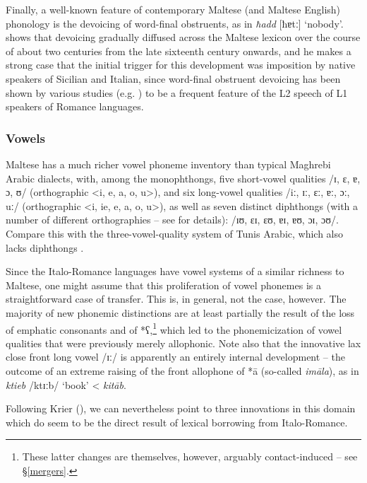 \documentclass[output=paper]{langsci/langscibook}
\begin{document}
Finally, a well-known feature of contemporary Maltese (and Maltese English) phonology is the devoicing of word-final obstruents, as in \textit{ħadd} [ħɐtː] `nobody'. \cite{Avram2017devoicing} shows that devoicing gradually diffused across the Maltese lexicon over the course  of about two centuries from the late sixteenth century onwards, and he makes a strong case that the initial trigger for this development was imposition by native speakers of Sicilian and Italian, since  word-final obstruent devoicing has been shown by various studies (e.g. \citealt{Flegemunromackay1995}) to be a frequent feature of the L2 speech of L1 speakers of Romance languages.

\subsubsection{Vowels} %
Maltese has a much richer vowel phoneme inventory than typical Maghrebi Arabic dialects, with, among the monophthongs, five short-vowel qualities /ɪ, ɛ, ɐ, ɔ, ʊ/ (orthographic <i, e, a, o, u>), and six long-vowel qualities /iː, ɪː, ɛː, ɐː, ɔː, uː/ (orthographic <i, ie, e, a, o, u>), as well as seven distinct diphthongs (with a number of different orthographies -- see \citealt[299]{BorgAzzopardi-Alexander1997} for details): /ɪʊ, ɛɪ, ɛʊ, ɐɪ, ɐʊ, ɔɪ, ɔʊ/. Compare this with the three-vowel-quality system of Tunis Arabic, which also lacks diphthongs \citep{Gibson2011}. 

Since the Italo-Romance languages have vowel systems of a similar richness to Maltese, one might assume that this proliferation of vowel phonemes is a straightforward case of transfer. This is, in general, not the case, however. The majority of new phonemic distinctions are at least partially the result of the loss of emphatic consonants and of *ʕ,\footnote{These latter changes are themselves, however, arguably contact-induced -- see §\ref{mergers}.} which led to the phonemicization of vowel qualities that were previously merely allophonic. Note also that the innovative lax close front long vowel /ɪː/ is apparently an entirely internal development -- the outcome of an extreme raising of the front allophone of *\={a} (so-called \textit{im\={a}la}), as in \textit{ktieb} /ktɪːb/ `book' < \textit{kit\={a}b}.

Following Krier (\citeyear[21--22]{krier1976}), we can nevertheless point to three innovations in this domain which do seem to be the direct result of lexical borrowing from Italo-Romance.
\end{document}
